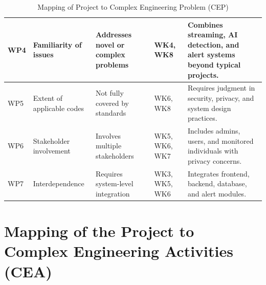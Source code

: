 \documentclass[10pt,openany]{report}
\begin{document}
\begin{sloppypar}
{{{\begin{sloppypar}
\begin{table}[H]
\begin{tabular}{|p{1.2cm}|p{3cm}|p{4cm}|p{2.5cm}|p{4.5cm}|}
WP4 & Familiarity of issues &
Addresses novel or complex problems &
WK4, WK8 &
Combines streaming, AI detection, and alert systems beyond typical projects. \\
\hline

WP5 & Extent of applicable codes &
Not fully covered by standards &
WK6, WK8 &
Requires judgment in security, privacy, and system design practices. \\
\hline

WP6 & Stakeholder involvement &
Involves multiple stakeholders &
WK5, WK6, WK7 &
Includes admins, users, and monitored individuals with privacy concerns. \\
\hline

WP7 & Interdependence &
Requires system-level integration &
WK3, WK5, WK6 &
Integrates frontend, backend, database, and alert modules. \\
\hline

\end{tabular}

\caption{Mapping of Project to Complex Engineering Problem (CEP)}
\label{tab:cep_mapping}

\end{table}

\section{Mapping of the Project to Complex Engineering Activities (CEA)}

\begin{table}[H]
\centering
\renewcommand{\arraystretch}{1.2}
\setlength{\tabcolsep}{3pt}

\end{table}
\end{sloppypar}}}}
\end{sloppypar}
\end{document}
